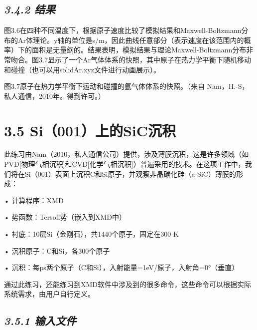 \hypertarget{ux7ed3ux679c-3}{%
\subsection{\texorpdfstring{\emph{3.4.2
结果}}{3.4.2 结果}}\label{ux7ed3ux679c-3}}

图3.6在四种不同温度下，根据原子速度比较了模拟结果和Maxwell-Boltzmann分布的Ar体理论。y轴的单位是s/m，因此曲线任意部分（表示速度在该范围内的概率）下的面积是无量纲的。结果表明，模拟结果与理论Maxwell-Boltzmann分布非常吻合。图3.7显示了一个Ar气体体系的快照，其中原子在热力学平衡下随机移动和碰撞（也可以用solidAr.xyz文件进行动画展示）。


图3.7原子在热力学平衡下运动和碰撞的氩气体体系的快照。（来自
Nam，H.-S，私人通信，2010年。得到许可。）

\hypertarget{si001ux4e0aux7684sicux6c89ux79ef}{%
\section{3.5
Si（001）上的SiC沉积}\label{si001ux4e0aux7684sicux6c89ux79ef}}

此练习由Nam（2010，私人通信公司）提供，涉及薄膜沉积，这是许多领域（如PVD{[}物理气相沉积{]}和CVD{[}化学气相沉积{]}）普遍采用的技术。在这项工作中，我们将在Si（001）表面上沉积C和Si原子，并观察非晶碳化硅（a-SiC）薄膜的形成：

• 计算程序：XMD

• 势函数：Tersoff势（嵌入到XMD中）

• 衬底：10层Si（金刚石），共1440个原子，固定在300 K

• 沉积原子：C和Si，各300个原子

• 沉积：每ps两个原子（C和Si），入射能量=1eV/原子，入射角=0°（垂直）

通过此练习，还能练习到XMD软件中涉及到的很多命令，这些命令可以根据实际系统需求，由用户自行定义。

\hypertarget{ux8f93ux5165ux6587ux4ef6-3}{%
\subsection{\texorpdfstring{\emph{3.5.1
输入文件}}{3.5.1 输入文件}}\label{ux8f93ux5165ux6587ux4ef6-3}}



